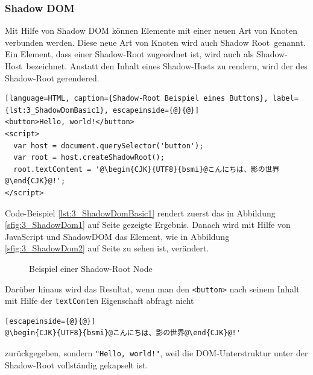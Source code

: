 \subsubsection{Shadow DOM}
\label{sec:3_WC_Shadow_DOM}

Mit Hilfe von Shadow DOM können Elemente mit einer neuen Art von Knoten verbunden werden. Diese neue Art von Knoten wird auch \glqq Shadow Root\grqq\ genannt. Ein Element, dass einer Shadow-Root zugeordnet ist, wird auch als \glqq Shadow-Host\grqq\ bezeichnet. Anstatt den Inhalt eines Shadow-Hosts zu rendern, wird der des Shadow-Root gerendered.

\begin{lstlisting}[language=HTML, caption={Shadow-Root Beispiel eines Buttons}, label={lst:3_ShadowDomBasic1}, escapeinside={@}{@}]
<button>Hello, world!</button>
<script>
  var host = document.querySelector('button');
  var root = host.createShadowRoot();
  root.textContent = '@\begin{CJK}{UTF8}{bsmi}@こんにちは、影の世界@\end{CJK}@!';
</script>
\end{lstlisting}

Code-Beispiel \ref{lst:3_ShadowDomBasic1} rendert zuerst das in Abbildung \ref{sfig:3_ShadowDom1} auf Seite \pageref{sfig:3_ShadowDom1} gezeigte Ergebnis. Danach wird mit Hilfe von JavaScript und ShadowDOM das Element, wie in Abbildung \ref{sfig:3_ShadowDom2} auf Seite \pageref{sfig:3_ShadowDom2} zu sehen ist, verändert.

\begin{figure}[h]
  \centering
  \qquad
  \caption[
    Beispiel einer Shadow-Root Node
  ]{
    Beispiel einer Shadow-Root Node
  }
  \label{sfig:3_ShadowDom}
\end{figure}

Darüber hinaus wird das Resultat, wenn man den \lstinline|<button>| nach seinem Inhalt mit Hilfe der \lstinline|textConten| Eigenschaft abfragt nicht
\begin{lstlisting}[escapeinside={@}{@}]
@\begin{CJK}{UTF8}{bsmi}@こんにちは、影の世界@\end{CJK}@!'
\end{lstlisting}
zurückgegeben, sondern \lstinline|"Hello, world!"|, weil die DOM-Unterstruktur unter der Shadow-Root vollständig gekapselt ist.

